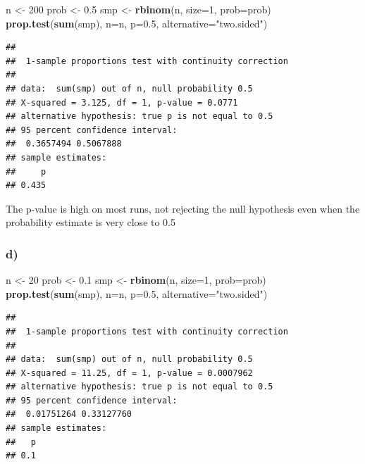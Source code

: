 \documentclass[
]{article}
\newenvironment{Shaded}{\begin{snugshade}}{\end{snugshade}}
\newcommand{\AttributeTok}[1]{\textcolor[rgb]{0.13,0.29,0.53}{#1}}
\newcommand{\DecValTok}[1]{\textcolor[rgb]{0.00,0.00,0.81}{#1}}
\newcommand{\FloatTok}[1]{\textcolor[rgb]{0.00,0.00,0.81}{#1}}
\newcommand{\FunctionTok}[1]{\textcolor[rgb]{0.13,0.29,0.53}{\textbf{#1}}}
\newcommand{\NormalTok}[1]{#1}
\newcommand{\OtherTok}[1]{\textcolor[rgb]{0.56,0.35,0.01}{#1}}
\newcommand{\StringTok}[1]{\textcolor[rgb]{0.31,0.60,0.02}{#1}}
\begin{document}
\begin{Shaded}
\begin{Highlighting}[]
\NormalTok{n }\OtherTok{\textless{}{-}} \DecValTok{200}
\NormalTok{prob }\OtherTok{\textless{}{-}} \FloatTok{0.5}
\NormalTok{smp }\OtherTok{\textless{}{-}} \FunctionTok{rbinom}\NormalTok{(n, }\AttributeTok{size=}\DecValTok{1}\NormalTok{, }\AttributeTok{prob=}\NormalTok{prob)}
\FunctionTok{prop.test}\NormalTok{(}\FunctionTok{sum}\NormalTok{(smp), }\AttributeTok{n=}\NormalTok{n, }\AttributeTok{p=}\FloatTok{0.5}\NormalTok{, }\AttributeTok{alternative=}\StringTok{"two.sided"}\NormalTok{)}
\end{Highlighting}
\end{Shaded}

\begin{verbatim}
## 
##  1-sample proportions test with continuity correction
## 
## data:  sum(smp) out of n, null probability 0.5
## X-squared = 3.125, df = 1, p-value = 0.0771
## alternative hypothesis: true p is not equal to 0.5
## 95 percent confidence interval:
##  0.3657494 0.5067888
## sample estimates:
##     p 
## 0.435
\end{verbatim}

The p-value is high on most runs, not rejecting the null hypothesis even
when the probability estimate is very close to 0.5

\subsubsection{d)}\label{d}

\begin{Shaded}
\begin{Highlighting}[]
\NormalTok{n }\OtherTok{\textless{}{-}} \DecValTok{20}
\NormalTok{prob }\OtherTok{\textless{}{-}} \FloatTok{0.1}
\NormalTok{smp }\OtherTok{\textless{}{-}} \FunctionTok{rbinom}\NormalTok{(n, }\AttributeTok{size=}\DecValTok{1}\NormalTok{, }\AttributeTok{prob=}\NormalTok{prob)}
\FunctionTok{prop.test}\NormalTok{(}\FunctionTok{sum}\NormalTok{(smp), }\AttributeTok{n=}\NormalTok{n, }\AttributeTok{p=}\FloatTok{0.5}\NormalTok{, }\AttributeTok{alternative=}\StringTok{"two.sided"}\NormalTok{)}
\end{Highlighting}
\end{Shaded}

\begin{verbatim}
## 
##  1-sample proportions test with continuity correction
## 
## data:  sum(smp) out of n, null probability 0.5
## X-squared = 11.25, df = 1, p-value = 0.0007962
## alternative hypothesis: true p is not equal to 0.5
## 95 percent confidence interval:
##  0.01751264 0.33127760
## sample estimates:
##   p 
## 0.1
\end{verbatim}
\end{document}
